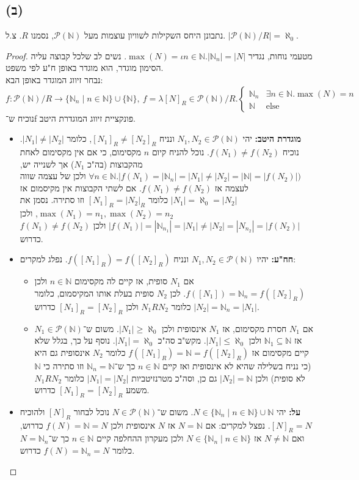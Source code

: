 \documentclass[]{article}
\newcommand\N     {\mathbb{N}}
\newcommand\ps    {\mathcal{P}}
\newcommand\other {\text{else}}
\newcommand\az    {\aleph_0}
\begin{document}
	\subsection*{(ב)}
	נתבונן היחס השקילות לשוויון עוצמות מעל $\ps(\N)$, נסמנו $R$. צ.ל. $|\ps(\N) / R | = \az$. 
	\begin{proof}
		מטעמי נוחות, נגדיר $ \max(N) = \iota n \in \N. |\N_n| = |N| $. נשים לב שלכל קבוצה עליה הסימון מוגדר, הוא מוגדר באופן ח"ע לפי משפט. \\
		נבחר זיווג המוגדר באופן הבא:
		$$ f \colon \ps(\N)/R \to \{\N_n \mid n \in \N\} \cup \{\N\},\ f = \lambda [N]_R \in \ps(\N)/R. \begin{cases}
			\N_n &\exists n \in \N. \max(N) = n \\
			\N &\other
		\end{cases}$$
	נוכיח ש־f פונקציית זיווג המוגדרת היטב. 
	\begin{itemize}
		\item \textbf{מוגדרת היטב: }יהי $N_1, N_2 \in \ps(\N)$ ונניח $[N_1]_R \neq [N_2]_R$, כלומר $|N_1| \neq |N_2|$. נוכיח $f(N_1) \neq f(N_2)$. נוכל להניח קיום $n$ מקסימום, כי אם אין מקסימום לאחת מהקבוצות (בה"כ $N_1$) אך לשנייה יש, $\forall n \in \N. |f(N_1) = |\N_n| = |N_1|\neq |N_2| = |\N| = |f(N_2)|)$ ולכן של עצמה שווה לעצמה אז $f(N_1) \neq f(N_2)$. אם לשתי הקבוצות אין מקיסמום אז $|N_1| = \az = |N_2|$ כלומר $[N_1]_R = |N_2|_R$ וזו סתירה. נסמן את $\max(N_1) = n_1, \max(N_2) = n_2$, ולכן $|f(N_1)| = |\N_{n_1}| = |N_1| \neq |N_2| = |N_{n_2}| = |f(N_2)|$  ולכן $f(N_1) \neq f(N_2)$ כדרוש. 
		\item \textbf{חח"ע: }יהיו $N_1, N_2 \in \ps(\N)$ ונניח $f([N_1]_R) = f([N_2]_R)$. נפלג למקרים: 
		\begin{itemize}
			\item אם $N_1$ סופית, אז קיים לה מקסימום $n \in \N$ ולכן $f([N_1]) = \N_n =  f([N_2]_R)$. לכן $N_2$ סופית בעלת אותו המקיסמום, כלומר $|N_2| = \N_n = |N_1|$ כלומר $N_1 R N_2$ ולכן $[N_1]_R = [N_2]_R$ כדרוש. 
			\item אם $N_1$ חסרת מקסימום, אז $N_1$ אינסופית ולכן $|N_1| \ge \az$. משום ש־$N_1 \in \ps(\N)$ אז $\N_1 \subseteq \N$ ולכן $|N_1| \le \az$. מקש"ב סה"כ $|N_1| = \az$. נוסף על כך, בגלל שלא קיים מקסימום אז $f([N_1]_R) = \N = f([N_2]_R)$ כלומר $N_2$ אינסופית גם היא (כי נניח בשלילה שהיא לא אינסופית ואז קיים $n \in \N$ כך ש־$\N_n = \N$ וזו סתירה כי $\N$ לא סופית) ולכן $|N_2| = \N$ גם כן, וסה"כ מטרנזיטביות $|N_1| = |N_2|$ כלומר $N_1RN_2$ משמע $[N_1]_R = [N_2]_R$ כדרוש. 
		\end{itemize}
		\item \textbf{על: }יהי $N \in \{\N_n \mid n \in \N\} \cup \N$. משום ש־$N \in \ps(\N)$ נוכל לבחור $[N]_R$ ולהוכיח $[N]_R = N$. נפצל למקרים: אם $N = \N$ אז $N$ אינסופית ולכן $f(N) = \N = N$ כדרוש, ואם $N \neq \N$ אז $N \in \{\N_n \mid n \in \N\}$ ולכן מעקרון ההחלפה קיים $n \in \N$ כך ש־$N = \N_n$ כלומר $f(N) = \N_n = N$ כדרוש.  

\end{itemize}
\end{proof}
\end{document}
